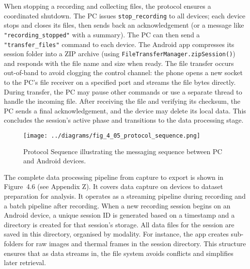 When stopping a recording and collecting files, the protocol ensures a coordinated shutdown. The PC issues \texttt{stop\_recording} to all devices; each device stops and closes its files, then sends back an acknowledgement (or a message like \texttt{"recording\_stopped"} with a summary). The PC can then send a \texttt{"transfer\_files"} command to each device. The Android app compresses its session folder into a ZIP archive (using \texttt{FileTransferManager.zipSession()}) and responds with the file name and size when ready. The file transfer occurs out-of-band to avoid clogging the control channel: the phone opens a new socket to the PC's file receiver on a specified port and streams the file bytes directly. During transfer, the PC may pause other commands or use a separate thread to handle the incoming file. After receiving the file and verifying its checksum, the PC sends a final acknowledgement, and the device may delete its local data. This concludes the session's active phase and transitions to the data processing stage.

\begin{figure}[htbp]
    \centring
    \texttt{[image: ../diagrams/fig\_4\_05\_protocol\_sequence.png]}
    \caption{Protocol Sequence illustrating the messaging sequence between PC and Android devices.}
    \label{fig:4_05_protocol_sequence}
\end{figure}

The complete data processing pipeline from capture to export is shown in Figure~4.6 (see Appendix Z). It covers data capture on devices to dataset preparation for analysis. It operates as a streaming pipeline during recording and a batch pipeline after recording. When a new recording session begins on an Android device, a unique session ID is generated based on a timestamp and a directory is created for that session's storage. All data files for the session are saved in this directory, organised by modality. For instance, the app creates sub-folders for raw images and thermal frames in the session directory. This structure ensures that as data streams in, the file system avoids conflicts and simplifies later retrieval.

